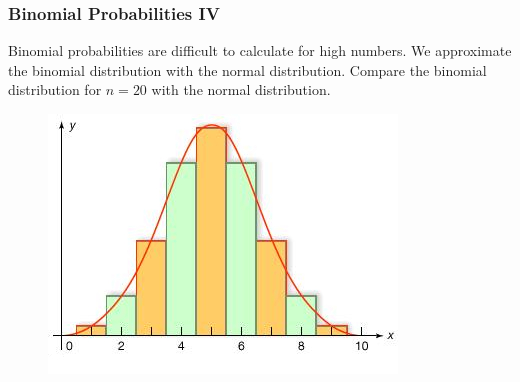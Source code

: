 \documentclass[xcolor=dvipsnames]{beamer}
\begin{document}
\begin{frame}
  \frametitle{Binomial Probabilities IV}
Binomial probabilities are difficult to calculate for high numbers. We
approximate the binomial distribution with the \alert{normal distribution}.
Compare the binomial distribution for $n=20$ with the normal
distribution.
  \begin{figure}[h]
    \includegraphics[scale=.5]{./diagrams/binnorm1_ed.jpg}
  \end{figure}
\end{frame}


\end{document}
